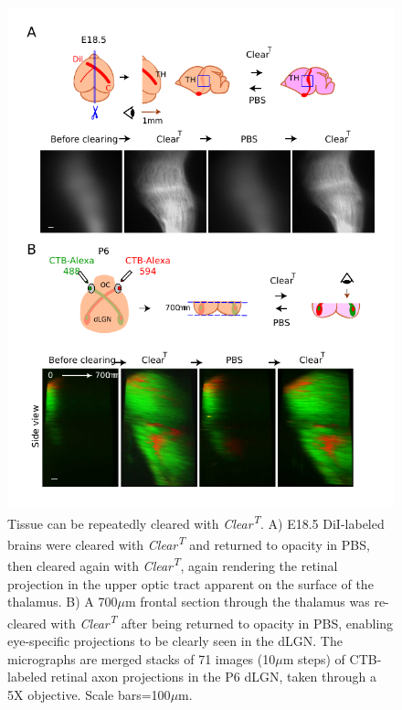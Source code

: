 \begin{figure}[hbtp]
    \begin{center}
        \includegraphics{Figures/ClearT_SFig3}
        \caption[Tissue can be repeatedly cleared with \emph{Clear\textsuperscript{T}}.]
        {Tissue can be repeatedly cleared with \emph{Clear\textsuperscript{T}}.
		A) E18.5 DiI-labeled brains were cleared with \emph{Clear\textsuperscript{T}} and returned to opacity in PBS, then cleared again with \emph{Clear\textsuperscript{T}}, again rendering the retinal projection in the upper optic tract apparent on the surface of the thalamus.
		B) A 700$\mu$m frontal section through the thalamus was re-cleared with \emph{Clear\textsuperscript{T}} after being returned to opacity in PBS, enabling eye-specific projections to be clearly seen in the dLGN.
		The micrographs are merged stacks of 71 images (10$\mu$m steps) of CTB-labeled retinal axon projections in the P6 dLGN, taken through a 5X objective.
		Scale bars=100$\mu$m.
		}
        \label{ClearT_SFig3}
    \end{center}
\end{figure}